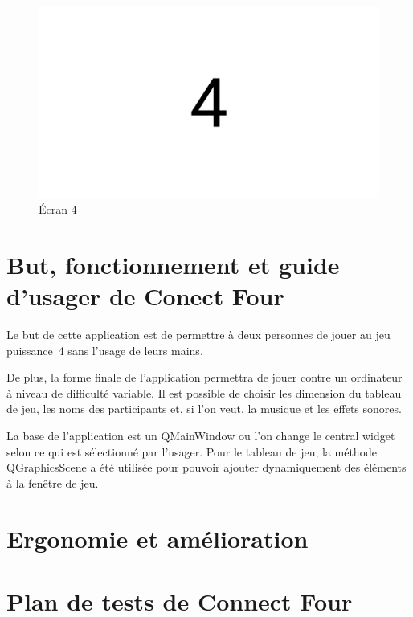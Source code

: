 \begin{figure}[H]
    \centering
    \includegraphics[width=6in]{img/4}
    \caption{Écran 4}
\end{figure}

\section{But, fonctionnement et guide d'usager de Conect Four}

Le but de cette application est de permettre à deux personnes de jouer au jeu puissance~4 sans l’usage de leurs mains.

De plus, la forme finale de l’application permettra de jouer contre un ordinateur à niveau de difficulté variable.
Il est possible de choisir les dimension du tableau de jeu, les noms des participants et, si l’on veut, la musique et les effets sonores.

La base de l’application est un QMainWindow ou l’on change le central widget selon ce qui est sélectionné par l’usager.
Pour le tableau de jeu, la méthode QGraphicsScene a été utilisée pour pouvoir ajouter dynamiquement des éléments à la fenêtre de jeu.

\section{Ergonomie et amélioration}

\section{Plan de tests de Connect Four}

